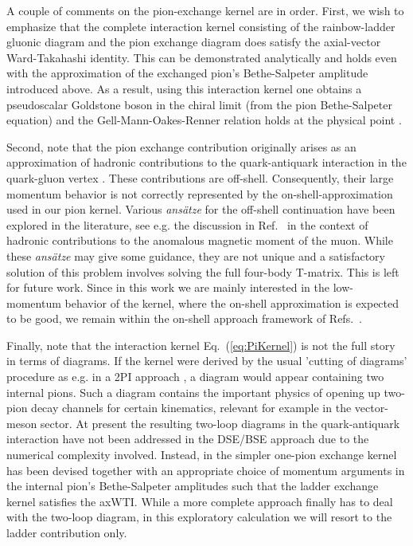 A couple of comments on the pion-exchange kernel are in order.
First, we wish to emphasize that the complete interaction kernel consisting of
the rainbow-ladder gluonic diagram and the pion exchange diagram does
satisfy the axial-vector Ward-Takahashi identity. This can be demonstrated 
analytically \cite{Fischer:2007ze,Fischer:2008wy} and holds even with the
approximation of the exchanged pion's Bethe-Salpeter amplitude introduced above. As a result,
using this interaction kernel one obtains a pseudoscalar Goldstone boson
in the chiral limit (from the pion Bethe-Salpeter equation) and the 
Gell-Mann-Oakes-Renner relation holds at the
physical point \cite{Fischer:2007ze,Fischer:2008wy}. 

Second, note that the pion exchange contribution originally arises as an
approximation of hadronic contributions to the quark-antiquark interaction
in the quark-gluon vertex \cite{Fischer:2007ze}. These contributions are
off-shell. Consequently, their large momentum behavior is not correctly
represented by the on-shell-approximation used in our pion kernel. Various
\textit{ans\"atze} for the off-shell continuation have been explored in the literature, 
see e.g. the discussion in Ref.~\cite{Nyffeler:2009tw} in the context of 
hadronic contributions to the anomalous magnetic moment of the muon. While 
these \textit{ans\"atze} may give some guidance, they are not unique and a satisfactory
solution of this problem involves solving the full four-body T-matrix. This
is left for future work. Since in this work we are mainly interested in 
the low-momentum behavior of the kernel, where the on-shell approximation is 
expected to be good, we remain within the on-shell approach framework of 
Refs.~\cite{Fischer:2007ze,Fischer:2008sp,Fischer:2008wy}.


Finally, note that the interaction kernel Eq.~(\ref{eq:PiKernel}) is not the 
full story in terms of diagrams. If the kernel were derived by the usual 
'cutting of diagrams' procedure as e.g. in a 2PI approach \cite{Munczek:1994zz}, 
a diagram would appear containing two internal pions. Such a diagram 
contains the important physics of opening up two-pion decay channels for certain
kinematics, relevant for example in the vector-meson sector. At present the resulting 
two-loop diagrams in the quark-antiquark interaction have not been addressed in the
DSE/BSE approach due to the numerical complexity involved. Instead, in 
\cite{Fischer:2007ze,Fischer:2008wy} the simpler one-pion exchange kernel has
been devised together with an appropriate choice of momentum arguments in the 
internal pion's Bethe-Salpeter amplitudes such that the ladder exchange 
kernel satisfies the axWTI. While a more complete approach finally has 
to deal with the two-loop diagram, in this exploratory calculation we will 
resort to the ladder contribution only.  


